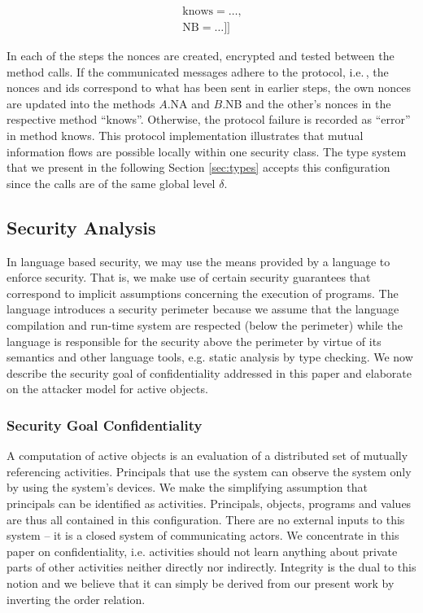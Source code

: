 \documentclass[10pt, conference, compsocconf]{IEEEtran}
\newcommand\ie{i.e.\!\,, }
\begin{document}
{\begin{small}
\[\begin{array}{l}
  \ \text{knows} = \ldots,  \\
  \ \text{NB} = \dots ]]
\end{array}
\]
\end{small}
 In each of the steps the nonces are created,
encrypted and tested between the method calls. If the communicated messages adhere to
the protocol, \ie the nonces and ids correspond to what has been sent in earlier steps,
the own nonces are updated into the methods $A.$NA and $B.$NB and the other's
nonces in the respective method ``knows''. Otherwise, the 
protocol failure is recorded as ``error'' in method knows. This protocol implementation 
illustrates that mutual information flows are possible locally within one security class. 
The type system that we present in the following Section \ref{sec:types}
accepts this configuration since the calls are of the same global level $\delta$.

\subsection{Security Analysis}
\label{sec:sec}
In language based security, we may use the means provided by a language to enforce security.
That is, we make use of certain security guarantees that correspond to implicit assumptions 
concerning the execution of programs. The language introduces a security perimeter because we
assume that the language compilation and run-time system are respected (below the perimeter) while
the language is responsible for the security above the perimeter by virtue of its semantics
and other language tools, e.g. static analysis by type checking.
We now describe the security goal of confidentiality addressed in this paper and elaborate
on the attacker model for active objects.

\subsubsection*{Security Goal Confidentiality}
A computation of active objects is an evaluation of a distributed set of mutually referencing
activities. Principals that use the system can observe the system only by using the system's
devices. We make the simplifying assumption that principals can be identified as activities.
Principals, objects, programs and values are thus all contained in this configuration.
There are no external inputs to this system -- it is a closed system of communicating actors.
We concentrate in this paper on confidentiality, i.e. activities should not learn anything
about private parts of other activities neither directly nor indirectly.
Integrity is the dual to this notion and we believe that it can simply be derived from our present
work by inverting the order relation.

}
\end{document}
